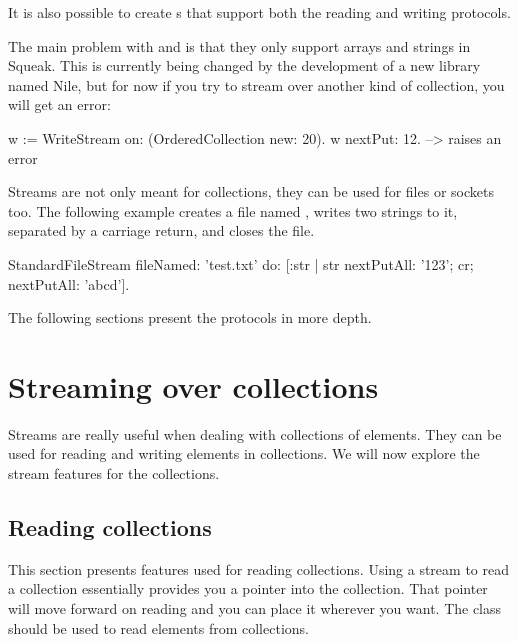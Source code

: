 \documentclass[a4paper,10pt,twoside]{book}
\begin{document}
It is also possible to create s that support both
the reading and writing protocols.

The main problem with  and  is
that they only support arrays and strings in Squeak. This is currently
being changed by the development of a new library named Nile, 
but for now if you try to stream over another kind of
collection, you will get an error:

\begin{code}{}
w := WriteStream on: (OrderedCollection new: 20).
w nextPut: 12. -->  raises an error
\end{code}

Streams are not only meant for collections, they can be used for files or sockets
too. The following example creates a file named , writes two strings to it, separated by a carriage return, and closes the file.

\begin{code}{}
StandardFileStream
  fileNamed: 'test.txt'
  do: [:str | str
                nextPutAll: '123';
                cr;
                nextPutAll: 'abcd'].
\end{code}

The following sections present the protocols in more depth.

\section{Streaming over collections}

Streams are really useful when dealing with collections of
elements. They can be used for reading and writing elements in
collections. We will now explore the stream features for the
collections.

\subsection{Reading collections}

This section presents features used for reading collections. Using a
stream to read a collection essentially provides you a pointer into the collection. That pointer will move forward on reading and you can place it wherever you want. The class  should be used to read elements from collections.
\end{document}
